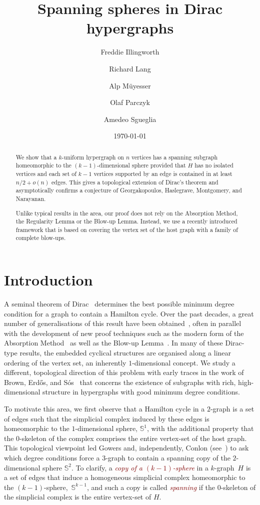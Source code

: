 \documentclass[12pt,reqno]{amsart}
\title{Spanning spheres in Dirac hypergraphs}
\date{\today}
\author[F.~Illingworth]{Freddie Illingworth}
\author[R.~Lang]{Richard Lang}
\author[A.~M\"{u}yesser]{Alp M\"{u}yesser}
\author[O.~Parczyk]{Olaf Parczyk}
\author[A.~Sgueglia]{Amedeo Sgueglia}
\theoremstyle{plain}
\theoremstyle{definition}
\numberwithin{equation}{section}
\newcommand{\defn}[1]{\textcolor{Maroon}{\emph{#1}}}
\newcommand{\bS}{\mathbb{S}}
\begin{document}
	
	\begin{abstract}
		We show that a $k$-uniform hypergraph on $n$ vertices has a spanning subgraph homeomorphic to the $(k - 1)$-dimensional sphere provided that $H$ has no isolated vertices and each set of $k - 1$ vertices supported by an edge is contained in at least $n/2 + o(n)$ edges.
		This gives a topological extension of Dirac's theorem and asymptotically confirms a conjecture of Georgakopoulos, Haslegrave, Montgomery, and Narayanan.
		
		Unlike typical results in the area, our proof does not rely on the Absorption Method, the Regularity Lemma or the Blow-up Lemma.
		Instead, we use a recently introduced framework that is based on covering the vertex set of the host graph with a family of complete blow-ups.
	\end{abstract}
	
	\maketitle
	


	\section{Introduction}
	
	A seminal theorem of Dirac~\cite{Dirac} determines the best possible minimum degree condition for a graph to contain a Hamilton cycle.
	Over the past decades, a great number of generalisations of this result have been obtained~\cite{SS19}, often  in parallel with the development of new proof techniques such as the modern form of the Absorption Method~\cite{RRS08a} as well as the Blow-up Lemma~\cite{KSS98}.
	In many of these Dirac-type results, the embedded cyclical structures are organised along a linear ordering of the vertex set, an inherently $1$-dimensional concept.
	We study a different, topological direction of this problem with early traces in the work of Brown, Erdős, and Sós~\cite{SEB73} that concerns the existence of subgraphs with rich, high-dimensional structure in hypergraphs with good minimum degree conditions.
	
	To motivate this area, we first observe that a Hamilton cycle in a $2$-graph is a set of edges such that the simplicial complex induced by these edges is homeomorphic to the $1$-dimensional sphere, $\bS^1$, with the additional property that the $0$-skeleton of the complex comprises the entire vertex-set of the host graph.
	This topological viewpoint led Gowers and, independently, Conlon (see~\cite{georgakopoulos2022spanning}) to ask which degree conditions force a $3$-graph to contain a spanning copy of the $2$-dimensional sphere $\mathbb{S}^2$.
	To clarify, a \defn{copy of a $(k - 1)$-sphere} in a $k$-graph~$H$ is a set of edges that induce a homogeneous simplicial complex homeomorphic to the $(k - 1)$-sphere,~$\mathbb{S}^{k - 1}$, and such a copy is called \defn{spanning} if the $0$-skeleton of the simplicial complex is the entire vertex-set of $H$.
	
\end{document}
